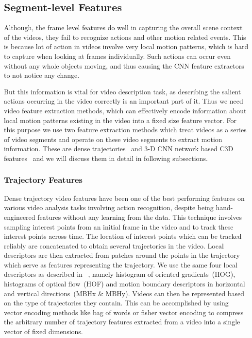 \subsection{Segment-level Features}
Although, the frame level features do well in capturing the overall scene
context of the videos, they fail to recognize actions and other motion related
events.
This is because lot of action in videos involve very local motion patterns,
which is hard to capture when looking at frames individually.
Such actions can occur even without any whole objects moving, and thus causing
the CNN feature extractors to not notice any change.

But this information is vital for video description task, as describing the
salient actions occurring in the video correctly is an important part of it.
Thus we need video feature extraction methods, which can effectively encode
information about local motion patterns existing in the video into a fixed size
feature vector.
For this purpose we use two feature extraction methods which treat videos as a
series of video segments and operate on these video segments to extract motion
information.
These are dense trajectories~\cite{DBLP:conf/cvpr/WangKSL11, Wang2013} and 3-D CNN
network based C3D features~\cite{DBLP:C3D} and we will discuss them in detail in
following subsections.

\subsubsection{Trajectory Features}

Dense trajectory video features have been one of the best performing features
on various video analysis tasks involving action recognition, despite being
hand-engineered features without any learning from the data.
This technique involves sampling interest points from an initial frame in the
video and to track these interest points across time.
The location of interest points which can be tracked reliably are concatenated
to obtain several trajectories in the video.
Local descriptors are then extracted from patches around the points in the
trajectory which serve as features representing the trajectory.
We use the same four local descriptors as described in
~\cite{DBLP:conf/cvpr/WangKSL11, Wang2013}, namely histogram of oriented
gradients~(HOG), histograms of optical flow~(HOF) and motion boundary
descriptors in horizontal and vertical directions~(MBHx \& MBHy).
Videos can then be represented based on the type of trajectories they contain.
This can be accomplished by using vector encoding methods like bag of words or
fisher vector encoding to compress the arbitrary number of trajectory features
extracted from a video into a single vector of fixed dimensions.

